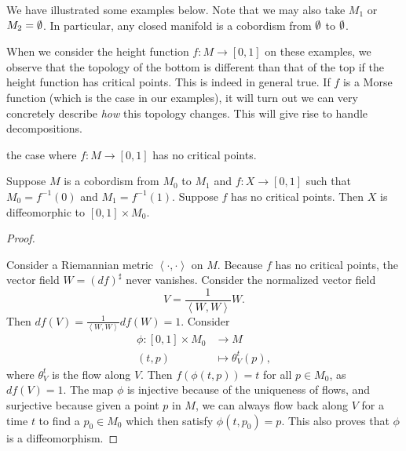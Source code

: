 We have illustrated some examples below.
Note that we may also take $M_1$ or $M_2 = \emptyset$.
In particular, any closed manifold is a cobordism from $\emptyset$ to $\emptyset$.
\begin{figure}[H]
    \centering
\end{figure}

When we consider the height function $f: M \to  [0, 1]$ on these examples,
we observe that the topology of the bottom is different than that of the top if the height function has critical points.
This is indeed in general true.
If $f$ is a Morse function (which is the case in our examples), it will turn out we can very concretely describe \emph{how} this topology changes.
This will give rise to handle decompositions.

 the case where $f: M \to [0, 1]$ has no critical points. 

\begin{prop}
    Suppose $M$ is a cobordism from $M_0$ to $ M_1$ and $f : X \to [0, 1] $ such that $M_0 = f^{-1}(0)$ and $M_1 = f^{-1}(1)$.
    Suppose $f$ has no critical points. Then $X$ is diffeomorphic to $[0, 1] \times  M_0$.
\end{prop}
\begin{proof}
    \begin{marginfigure}
        \centering
        \caption{TODO proof of cobordism without critical points}
        \label{fig:proof-of-cobordism-without-critical-points}
    \end{marginfigure}
    Consider a Riemannian metric $\left<\cdot ,\cdot  \right>$ on $M$.
    Because  $f$ has no critical points, the vector field $W = (df)^{\sharp}$ never vanishes.
    Consider the normalized vector field
    \[
    V = \frac{1}{\left<W, W \right>} W
    .\] 
    Then $df(V) = \frac{1}{\left<W, W \right>} df(W) = 1$.
    Consider
    \begin{align*}
        \phi: [0, 1] \times M_0&\longrightarrow M \\
        (t, p) &\longmapsto \theta_V^{t}(p)
    ,\end{align*}
    where $\theta_V^{t}$ is the flow along $V$.
    Then $f(\phi(t, p)) = t$ for all $p \in M_0$, as $df(V) = 1$.
    The map $\phi$ is injective because of the uniqueness of flows, and surjective because given a point $p$ in $M$, we can always flow back along $V$ for a time $t$ to find a $p_0 \in M_0$ which then satisfy $\phi(t, p_0) = p$. 
    This also proves that $\phi$ is a diffeomorphism.
\end{proof}

